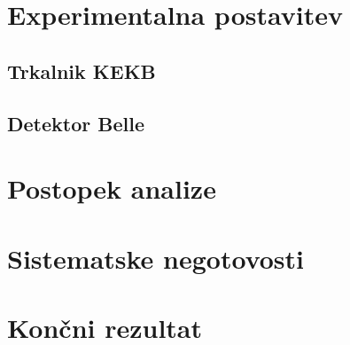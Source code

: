 \documentclass[headings=standardclasses,headings=big,oneside,a4paper,openany,12pt]{scrbook}
\begin{document}
\begin{otherlanguage}{slovene}
\section{Experimentalna postavitev}
\subsection{Trkalnik KEKB}
\subsection{Detektor Belle}
\section{Postopek analize}
\section{Sistematske negotovosti}
\section{Kon\v cni rezultat}
\end{otherlanguage}
\end{document}
